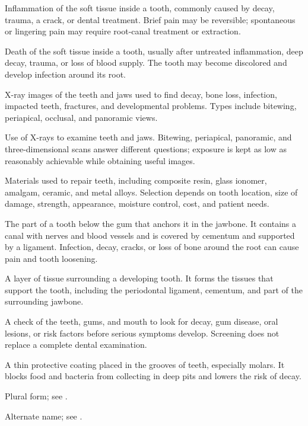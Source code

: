  Inflammation of the soft tissue inside a tooth, commonly caused by decay, trauma, a crack, or dental treatment. Brief pain may be reversible; spontaneous or lingering pain may require root-canal treatment or extraction.

 Death of the soft tissue inside a tooth, usually after untreated inflammation, deep decay, trauma, or loss of blood supply. The tooth may become discolored and develop infection around its root.

 X-ray images of the teeth and jaws used to find decay, bone loss, infection, impacted teeth, fractures, and developmental problems. Types include bitewing, periapical, occlusal, and panoramic views.

 Use of X-rays to examine teeth and jaws. Bitewing, periapical, panoramic, and three-dimensional scans answer different questions; exposure is kept as low as reasonably achievable while obtaining useful images.

 Materials used to repair teeth, including composite resin, glass ionomer, amalgam, ceramic, and metal alloys. Selection depends on tooth location, size of damage, strength, appearance, moisture control, cost, and patient needs.

 The part of a tooth below the gum that anchors it in the jawbone. It contains a canal with nerves and blood vessels and is covered by cementum and supported by a ligament. Infection, decay, cracks, or loss of bone around the root can cause pain and tooth loosening.

 A layer of tissue surrounding a developing tooth. It forms the tissues that support the tooth, including the periodontal ligament, cementum, and part of the surrounding jawbone.

 A check of the teeth, gums, and mouth to look for decay, gum disease, oral lesions, or risk factors before serious symptoms develop. Screening does not replace a complete dental examination.

 A thin protective coating placed in the grooves of teeth, especially molars. It blocks food and bacteria from collecting in deep pits and lowers the risk of decay.

 Plural form; see .

 Alternate name; see .

